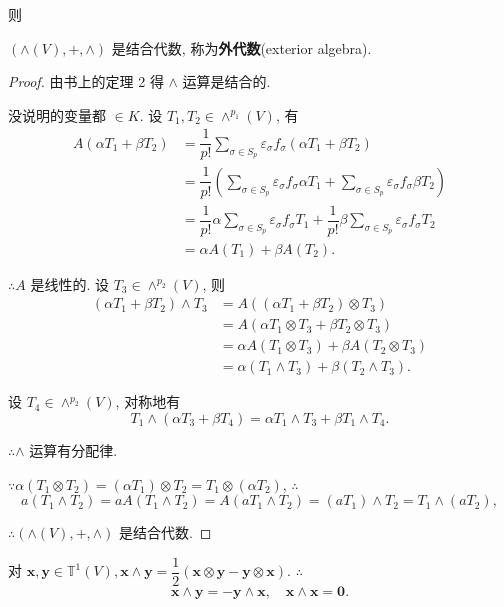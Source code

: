 \documentclass[color=black,device=normal,lang=cn,mode=geye]{elegantnote}
\begin{document}
则
\begin{theorem}
    $(\land(V),+,\land)$ 是结合代数, 称为\textbf{外代数}(exterior algebra).
\end{theorem}
\begin{proof}
    由书上的定理 2 得 $\land$ 运算是结合的.

    没说明的变量都 $\in K$. 设 $T_1,T_2\in\land^{p_1}(V)$, 有
    \begin{align*}
        A(\alpha T_1+\beta T_2) & =\dfrac{1}{p!}\sum\limits_{\sigma\in S_p}\varepsilon_\sigma f_\sigma(\alpha T_1+\beta T_2) \\
        & =\dfrac{1}{p!}\left(\sum\limits_{\sigma\in S_p}\varepsilon_\sigma f_\sigma\alpha T_1+\sum\limits_{\sigma\in S_p}\varepsilon_\sigma f_\sigma\beta T_2\right) \\
        & =\dfrac{1}{p!}\alpha\sum\limits_{\sigma\in S_p}\varepsilon_\sigma f_\sigma T_1+\dfrac{1}{p!}\beta\sum\limits_{\sigma\in S_p}\varepsilon_\sigma f_\sigma T_2 \\
        & =\alpha A(T_1)+\beta A(T_2).
    \end{align*}

    $\therefore A$ 是线性的. 设 $T_3\in\land^{p_2}(V)$, 则
    \begin{align*}
        (\alpha T_1+\beta T_2)\land T_3 & =A((\alpha T_1+\beta T_2)\otimes T_3) \\
        & =A(\alpha T_1\otimes T_3+\beta T_2\otimes T_3) \\
        & =\alpha A(T_1\otimes T_3)+\beta A(T_2\otimes T_3) \\
        & =\alpha (T_1\land T_3)+\beta (T_2\land T_3).
    \end{align*}

    设 $T_4\in\land^{p_2}(V)$, 对称地有
    \[T_1\land(\alpha T_3+\beta T_4)=\alpha T_1\land T_3+\beta T_1\land T_4.\]
    
    $\therefore\land$ 运算有分配律.

    $\because\alpha(T_1\otimes T_2)=(\alpha T_1)\otimes T_2=T_1\otimes(\alpha T_2)$, $\therefore$
    \[a(T_1\land T_2)=aA(T_1\land T_2)=A(aT_1\land T_2)=(aT_1)\land T_2=T_1\land(aT_2),\]

    $\therefore(\land(V),+,\land)$ 是结合代数.
\end{proof}
\begin{example}\label{exa4.1}
    对 $\boldsymbol{x},\boldsymbol{y}\in\mathbb{T}^1(V),\boldsymbol{x}\land\boldsymbol{y}=\dfrac{1}{2}(\boldsymbol{x}\otimes\boldsymbol{y}-\boldsymbol{y}\otimes\boldsymbol{x})$. $\therefore$
    \[\boldsymbol{x}\land\boldsymbol{y}=-\boldsymbol{y}\land\boldsymbol{x},\quad\boldsymbol{x}\land\boldsymbol{x}=\boldsymbol{0}.\]
\end{example}
\end{document}
